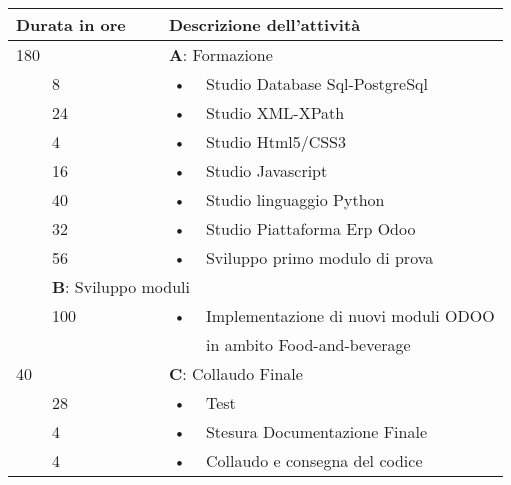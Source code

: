 \begin{center}
	\begin{tabular}{|l|l|c l|}
		\hline
		\multicolumn{2}{|l|}{\textbf{Durata in ore}}		&	\multicolumn{2}{l|}{\textbf{Descrizione dell'attività}}\\
		\hline
		\multicolumn{2}{|l|}{180}	&	\multicolumn{2}{l|}{\textbf{A}: Formazione}\\
		\hline
		\multirow{5}{1cm}{ } & 8  & \hspace{5mm}•\hspace{2mm} & Studio Database Sql-PostgreSql \\
		\multirow{5}{1cm}{ } & 24 & \hspace{5mm}•\hspace{2mm} & Studio XML-XPath                 \\
		\multirow{5}{1cm}{ } & 4 & \hspace{5mm}•\hspace{2mm} & Studio Html5/CSS3\\
		\multirow{5}{1cm}{ } & 16 & \hspace{5mm}•\hspace{2mm} & Studio Javascript\\
		\multirow{5}{1cm}{ } & 40 & \hspace{5mm}•\hspace{2mm} & Studio linguaggio Python\\
		\multirow{5}{1cm}{ } & 32 & \hspace{5mm}•\hspace{2mm} & Studio Piattaforma Erp Odoo\\
		\multirow{5}{1cm}{ } & 56  & \hspace{5mm}•\hspace{2mm} & Sviluppo primo modulo di prova \\
		\hline																											
		\multicolumn{2}{|l|}{100}	&	\multicolumn{2}{l|}{\textbf{B}: Sviluppo moduli}\\
		\hline
		\multirow{5}{1cm}{ } & 100  & \hspace{5mm}•\hspace{2mm} & Implementazione di nuovi moduli ODOO  \\ & & & in ambito Food-and-beverage\\
		
		\hline
		
		\multicolumn{2}{|l|}{40}	&	\multicolumn{2}{l|}{\textbf{C}: Collaudo Finale}\\
		\hline
		\multirow{5}{1cm}{ } & 28  & \hspace{5mm}•\hspace{2mm} & Test\\
		\multirow{5}{1cm}{ } & 4 & \hspace{5mm}•\hspace{2mm} & Stesura Documentazione Finale \\
		\multirow{5}{1cm}{ } & 4 & \hspace{5mm}•\hspace{2mm} & Collaudo e consegna del codice\\
		

\end{tabular}
\end{center}
